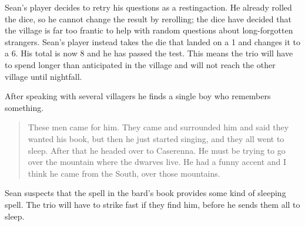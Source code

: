 
\begin{exampletext}

  Sean's player decides to retry his questions as a \gls{restingaction}.
  He already rolled the dice, so he cannot change the result by rerolling; the dice have decided that the village is far too frantic to help with random questions about long-forgotten strangers.
  Sean's player instead takes the die that landed on a 1 and changes it to a 6.
  His total is now 8 and he has passed the test.
  This means the trio will have to spend longer than anticipated in the village and will not reach the other village until nightfall.

  After speaking with several villagers he finds a single boy who remembers something.

  \begin{quotation}
  These men came for him.
  They came and surrounded him and said they wanted his book, but then he just started singing, and they all went to sleep.
  After that he headed over to Caserenna.
  He must be trying to go over the mountain where the dwarves live.
  He had a funny accent and I think he came from the South, over those mountains.
  \end{quotation}

  Sean suspects that the spell in the bard's book provides some kind of sleeping spell.
  The trio will have to strike fast if they find him, before he sends them all to sleep.

\end{exampletext}
